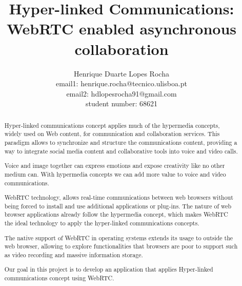 \documentclass{llncs}
\begin{document}
\pagestyle{plain}
\mainmatter              %

\title{Hyper-linked Communications: WebRTC enabled asynchronous collaboration}
\author{%
	Henrique Duarte Lopes Rocha \\
	email1: henrique.rocha@tecnico.ulisboa.pt \\
  email2: hdlopesrocha91@gmail.com \\
  student number: 68621
}
\maketitle              %

\begin{abstract}
Hyper-linked communications concept applies much of the hypermedia concepts, widely used on Web content, for communication and collaboration services. This paradigm allows to synchronize and structure the communications content, providing a way to integrate social media content and collaborative tools into voice and video calls.

Voice and image together can express emotions and expose creativity like no other medium can. With hypermedia concepts we can add more value to voice and video communications.

WebRTC technology, allows real-time communications between web browsers without being forced to install and use additional applications or plug-ins. The nature of web browser applications already follow the hypermedia concept, which makes WebRTC the ideal technology to apply the hyper-linked communications concepts.

The native support of WebRTC in operating systems extends its usage to outside the web browser, allowing to explore functionalities that browsers are poor to support such as video recording and massive information storage.

Our goal in this project is to develop an application that applies Hyper-linked communications concept using WebRTC.

\end{abstract}
\end{document}
